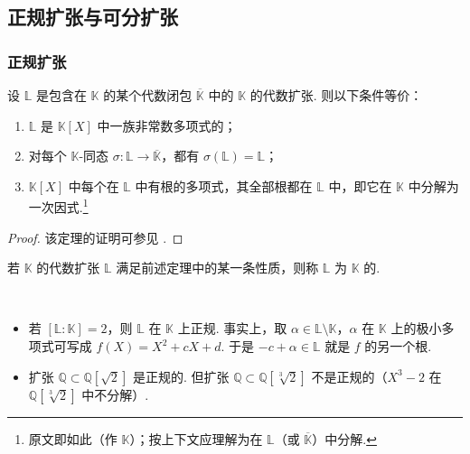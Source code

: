 \subsection{正规扩张与可分扩张}

\subsubsection{正规扩张}

\begin{theorem}\label{c2-thm-1-1}
设 $\mathbb{L}$ 是包含在 $\mathbb{K}$ 的某个代数闭包 $\overline{\mathbb{K}}$ 中的 $\mathbb{K}$ 的代数扩张. 则以下条件等价：
\begin{enumerate}
    \item $\mathbb{L}$ 是 $\mathbb{K}[X]$ 中一族非常数多项式的；
    \item 对每个 $\mathbb{K}$-同态 $\sigma:\mathbb{L}\to\overline{\mathbb{K}}$，都有 $\sigma(\mathbb{L})=\mathbb{L}$；
    \item $\mathbb{K}[X]$ 中每个在 $\mathbb{L}$ 中有根的多项式，其全部根都在 $\mathbb{L}$ 中，即它在 $\mathbb{K}$ 中分解为一次因式.\footnote{原文即如此（作 $\mathbb{K}$）；按上下文应理解为在 $\mathbb{L}$（或 $\overline{\mathbb{K}}$）中分解.}
\end{enumerate}
\end{theorem}

\begin{proof}
该定理的证明可参见 \cite[Chapter~5, \S3]{lang02a}.
\end{proof}

\begin{definition}\label{c2-def-1-5}
若 $\mathbb{K}$ 的代数扩张 $\mathbb{L}$ 满足前述定理中的某一条性质，则称 $\mathbb{L}$ 为 $\mathbb{K}$ 的.
\end{definition}

\begin{examples}\label{c2-ex-1-6}
\
\begin{itemize}
    \item 若 $[\mathbb{L}:\mathbb{K}]=2$，则 $\mathbb{L}$ 在 $\mathbb{K}$ 上正规. 事实上，取 $\alpha\in\mathbb{L}\setminus\mathbb{K}$，$\alpha$ 在 $\mathbb{K}$ 上的极小多项式可写成 $f(X)=X^{2}+cX+d$. 于是 $-c+\alpha\in\mathbb{L}$ 就是 $f$ 的另一个根.
    \item 扩张 $\mathbb{Q}\subset\mathbb{Q}[\sqrt{2}]$ 是正规的. 但扩张 $\mathbb{Q}\subset\mathbb{Q}[\sqrt[3]{2}]$ 不是正规的（$X^{3}-2$ 在 $\mathbb{Q}[\sqrt[3]{2}]$ 中不分解）.
\end{itemize}
\end{examples}

